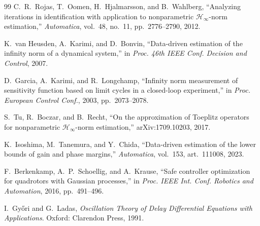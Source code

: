 \documentclass[letterpaper, 10 pt, conference]{ieeeconf}
\begin{document}
{\begin{thebibliography}{99}
 C.~R.~Rojas, T.~Oomen, H.~Hjalmarsson, and B.~Wahlberg,
``Analyzing iterations in identification with application to
nonparametric $\mathcal H_\infty$-norm estimation,'' \emph{Automatica},
vol.~48, no.~11, pp.~2776--2790, 2012.

 K.~van Heusden, A.~Karimi, and D.~Bonvin,
``Data-driven estimation of the infinity norm of a dynamical system,'' in
\emph{Proc. 46th IEEE Conf. Decision and Control}, 2007.

 D.~Garcia, A.~Karimi, and R.~Longchamp, ``Infinity norm
measurement of sensitivity function based on limit cycles in a
closed-loop experiment,'' in \emph{Proc. European Control Conf.},
2003, pp.~2073--2078.

 S.~Tu, R.~Boczar, and B.~Recht, ``On the approximation of
Toeplitz operators for nonparametric $\mathcal H_\infty$-norm
estimation,'' arXiv:1709.10203, 2017.

 K.~Isoshima, M.~Tanemura, and Y.~Chida,
``Data-driven estimation of the lower bounds of gain and phase margins,''
\emph{Automatica}, vol.~153, art.~111008, 2023.

 F.~Berkenkamp, A.~P.~Schoellig, and A.~Krause,
``Safe controller optimization for quadrotors with Gaussian processes,''
in \emph{Proc. IEEE Int. Conf. Robotics and Automation}, 2016,
pp.~491--496.

 I.~Gy\H{o}ri and G.~Ladas, \emph{Oscillation
Theory of Delay Differential Equations with Applications}. Oxford:
Clarendon Press, 1991.

\end{thebibliography}}
\end{document}
